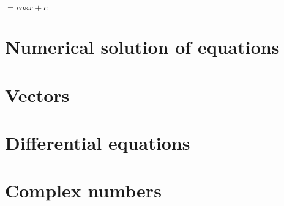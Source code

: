 \begin{solution}
   $ = cosx +c $ \\
    
    
 \end{solution} 
 

\section{Numerical solution of equations}


\printsolutions


\section{Vectors}



\section{Differential equations}


\section{Complex numbers}



